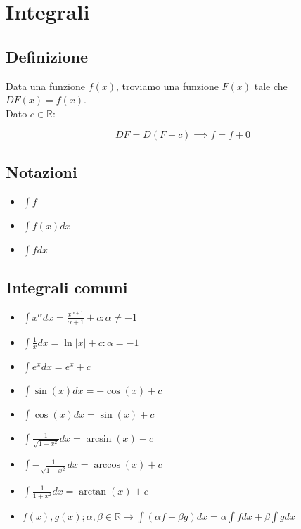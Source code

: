 \documentclass{subfiles}
\begin{document}
\section{Integrali}

\subsection{Definizione}

Data una funzione $f(x)$, troviamo una funzione $F(x)$ tale che $DF(x) = f(x)$.\\

\noindent
Dato $c \in \mathbb{R}$:

$$
DF = D(F + c) \implies f = f + 0
$$

\subsection{Notazioni}

\begin{itemize}
	\item $\int f$
	\item $\int f(x)dx$
	\item $\int fdx$
\end{itemize}

\subsection{Integrali comuni}

\begin{itemize}
	\item $\int x^\alpha dx = \frac{x^{\alpha + 1}}{\alpha + 1} + c : \alpha \neq -1$
	\item $\int \frac{1}{x} dx = \ln|x| + c : \alpha = -1$
	\item $\int e^x dx = e^x + c$
	\item $\int \sin(x) dx = -\cos(x) + c$
	\item $\int \cos(x) dx = \sin(x) + c$
	\item $\int \frac{1}{\sqrt{1 - x^2}} dx = \arcsin(x) + c$
	\item $\int -\frac{1}{\sqrt{1 - x^2}} dx = \arccos(x) + c$
	\item $\int \frac{1}{1 + x^2} dx = \arctan(x) + c$
	\item $f(x), g(x); \alpha, \beta \in \mathbb{R} \rightarrow \int (\alpha f + \beta g)dx = \alpha \int fdx + \beta \int gdx$
\end{itemize}
\end{document}

